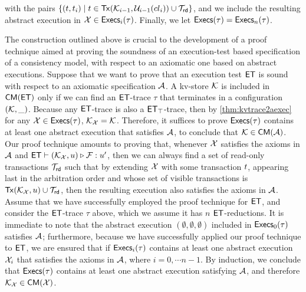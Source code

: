 with the pairs $\{(t, t_{i}) \mid  t \in \mathsf{Tx}(\mathcal{K}_{i-1}, \mathcal{U}_{i-1}({cl}_{i})) \cup \mathcal{T}_{\mathsf{rd}}\}$, 
and we include the resulting abstract execution in $\mathcal{X} \in \mathsf{Execs}_{i}(\tau)$. Finally, we 
let $\mathsf{Execs}(\tau) = \mathsf{Execs}_{n}(\tau)$.
%

The construction outlined above is crucial to the development of a proof technique aimed 
at proving the soundness of an execution-test based specification of a consistency 
model, with respect to an axiomatic one based on abstract executions. 
Suppose that we want to prove that an execution test $\mathsf{ET}$ is sound with respect 
to an axiomatic specification $\mathcal{A}$. A kv-store $\mathcal{K}$ is included in $\mathsf{CM}(\mathsf{ET})$ only 
if we can find an $\mathsf{ET}$-trace $\tau$ that terminates in a configuration $(\mathcal{K}, \_)$. Because 
any $\mathsf{ET}$-trace is also a $\mathsf{ET}_{\top}$-trace, then by \cref{thm:kvtrace2aexec} 
for any $\mathcal{X} \in \mathsf{Execs}(\tau)$, $\mathcal{K}_{\mathcal{X}} = \mathcal{K}$. Therefore, it suffices to prove 
$\mathsf{Execs}(\tau)$ contains at least one abstract execution that satisfies $\mathcal{A}$, to conclude 
that $\mathcal{K} \in \mathsf{CM}(\mathcal{A})$. 
Our proof technique amounts to proving that, whenever $\mathcal{X}$ satisfies the axioms in
$\mathcal{A}$ and $\mathsf{ET} \vdash (\mathcal{K}_{\mathcal{X}}, u) \triangleright 
\mathcal{F}: u'$, then we can always find a set of read-only transactions $\mathcal{T}_{\mathsf{rd}}$ such that 
by extending $\mathcal{X}$ with some transaction $t$, appearing last in the arbitration order 
and whose set of visible transactions is $\mathsf{Tx}(\mathcal{K}_{\mathcal{X}}, u) \cup \mathcal{T}_{\mathsf{rd}}$, then 
the resulting execution also satisfies the axioms in $\mathcal{A}$. Assume that we have successfully employed the 
proof technique for $\mathsf{ET}$, and consider the $\mathsf{ET}$-trace $\tau$ above, which we assume it has 
$n$ $\mathsf{ET}$-reductions. It is immediate to note that the abstract execution $(\emptyset, \emptyset, \emptyset)$ 
included in $\mathsf{Execs}_{0}(\tau)$ satisfies $\mathcal{A}$; furthermore, because we have successfully applied our proof technique to $\mathsf{ET}$, 
we are ensured that if $\mathsf{Execs}_{i}(\tau)$ contains at least one abstract execution $\mathcal{X}_{i}$ that satisfies the axioms in $\mathcal{A}$, where $i=0,\cdots n-1$. 
By induction, we conclude that $\mathsf{Execs}(\tau)$ contains at least one abstract execution satisfying $\mathcal{A}$, and 
therefore $\mathcal{K}_{\mathcal{X}} \in \mathsf{CM}(\mathcal{X})$. 

